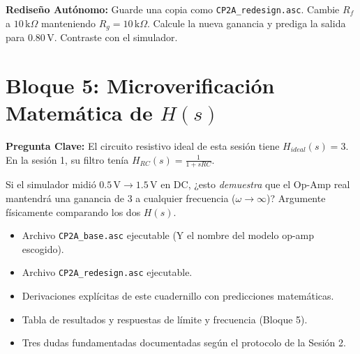 \documentclass[11pt, a4paper]{article}
\begin{document}
\vspace{2cm}
\textbf{Rediseño Autónomo:} Guarde una copia como \texttt{CP2A\_redesign.asc}. Cambie $R_f$ a $10\,\text{k}\Omega$ manteniendo $R_g=10\,\text{k}\Omega$. Calcule la nueva ganancia y prediga la salida para $0.80\,\text{V}$. Contraste con el simulador.

\section{Bloque 5: Microverificación Matemática de $H(s)$}
\textbf{Pregunta Clave:} El circuito resistivo ideal de esta sesión tiene $H_{ideal}(s) = 3$. En la sesión 1, su filtro tenía $H_{RC}(s) = \frac{1}{1+sRC}$. \par
Si el simulador midió $0.5\,\text{V} \to 1.5\,\text{V}$ en DC, ¿esto \textit{demuestra} que el Op-Amp real mantendrá una ganancia de 3 a cualquier frecuencia ($\omega \to \infty$)? Argumente físicamente comparando los dos $H(s)$.

\vspace{3.5cm}

\begin{tcolorbox}[colback=white, colframe=black, title=\textbf{Inventario de Evidencia para Entrega (CP2A)}]
    \begin{itemize}
        \item Archivo \texttt{CP2A\_base.asc} ejecutable (Y el nombre del modelo op-amp escogido).
        \item Archivo \texttt{CP2A\_redesign.asc} ejecutable.
        \item Derivaciones explícitas de este cuadernillo con predicciones matemáticas.
        \item Tabla de resultados y respuestas de límite y frecuencia (Bloque 5).
        \item Tres dudas fundamentadas documentadas según el protocolo de la Sesión 2.
    \end{itemize}
\end{tcolorbox}
\end{document}
